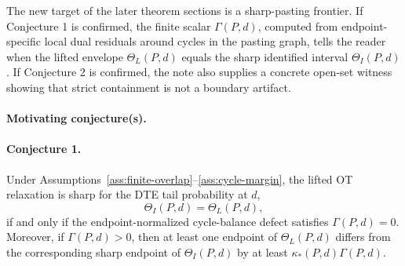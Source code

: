\documentclass[11pt]{article}
\theoremstyle{definition}
\theoremstyle{plain}
\theoremstyle{remark}
\begin{document}
The new target of the later theorem sections is a sharp-pasting frontier.  If Conjecture 1 is confirmed, the finite scalar \(\Gamma(P,d)\), computed from endpoint-specific local dual residuals around cycles in the pasting graph, tells the reader when the lifted envelope \(\Theta_L(P,d)\) equals the sharp identified interval \(\Theta_I(P,d)\).  If Conjecture 2 is confirmed, the note also supplies a concrete open-set witness showing that strict containment is not a boundary artifact.

\paragraph{Motivating conjecture(s).}
\paragraph{Conjecture 1.}
Under Assumptions~\ref{ass:finite-overlap}--\ref{ass:cycle-margin}, the lifted OT relaxation is sharp for the DTE tail probability at \(d\),
\[
\Theta_I(P,d)=\Theta_L(P,d),
\]
if and only if the endpoint-normalized cycle-balance defect satisfies \(\Gamma(P,d)=0\).  Moreover, if \(\Gamma(P,d)>0\), then at least one endpoint of \(\Theta_L(P,d)\) differs from the corresponding sharp endpoint of \(\Theta_I(P,d)\) by at least \(\kappa_*(P,d)\Gamma(P,d)\).
\end{document}
